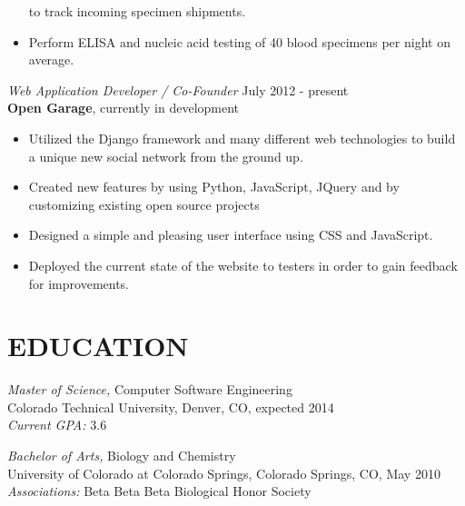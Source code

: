 \documentclass[margin]{res}
\begin{document}
\begin{resume}
\begin{itemize}
			to track incoming specimen shipments.
		\item	Perform ELISA and nucleic acid testing of 40 blood specimens per night on average.
    	\end{itemize}
        {\sl Web Application Developer / Co-Founder} \hfill            July 2012 - present \\
        {\bf Open Garage},		currently in development
        \begin{itemize}  \itemsep -2pt %
		\item Utilized the Django framework and many different web technologies to build a unique new social network from the ground up.
		\item Created new features by using Python, JavaScript, JQuery and by customizing existing open source projects
		\item Designed a simple and pleasing user interface using CSS and JavaScript.
		\item Deployed the current state of the website to testers in order to gain feedback for improvements.
     	\end{itemize} 
     	
\section{EDUCATION} 
		{\sl Master of Science,} Computer Software Engineering \\
		Colorado Technical University, Denver, CO, expected 2014 \\
		{\sl \indent Current GPA: } 3.6
		
		{\sl Bachelor of Arts,} Biology and Chemistry \\
                University of Colorado at Colorado Springs, Colorado Springs, CO, 
                May 2010 \\ 
		{\sl Associations:} Beta Beta Beta Biological Honor Society
        

\end{resume}
\end{document}
